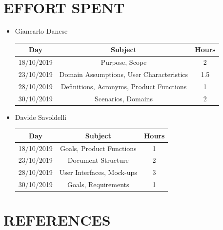 \documentclass[12pt,a4paper]{article}
\begin{document}
\section{EFFORT SPENT}
\begin{itemize}
		\item Giancarlo Danese
		\begin{center}
			\begin{tabular}{| c | c | c |}
				\hline
				Day & Subject & Hours \\ \hline
				18/10/2019 & Purpose, Scope & 2 \\
				23/10/2019 & Domain Assumptions, User Characteristics & 1.5 \\
				28/10/2019 & Definitions, Acronyms, Product Functions & 1 \\
				30/10/2019 & Scenarios, Domains & 2 \\
				\hline
			\end{tabular}
		\end{center}

		\item Davide Savoldelli
		\begin{center}
			\begin{tabular}{| c | c | c |}
				\hline
				Day & Subject & Hours \\ \hline
				18/10/2019 & Goals, Product Functions & 1 \\
				23/10/2019 & Document Structure & 2 \\
				28/10/2019 & User Interfaces, Mock-ups & 3 \\
				30/10/2019 & Goals, Requirements & 1 \\
				\hline
			\end{tabular}
		\end{center}
	\end{itemize}
\section{REFERENCES}
\end{document}
